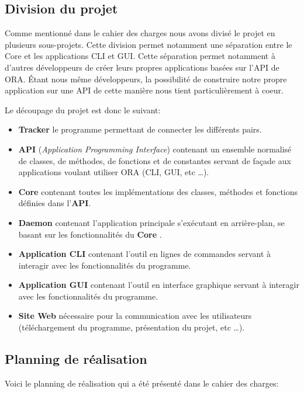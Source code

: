 \documentclass[11pt, a4paper]{report}
\begin{document}
    \clearpage
    \subsection{Division du projet}
Comme mentionné dans le cahier des charges nous avons divisé le projet en plusieurs sous-projets. Cette division permet notamment une séparation entre le Core et les applications CLI et GUI. Cette séparation permet notamment à d'autres développeurs de créer leurs propres applications basées sur l'API de ORA. Étant nous même développeurs, la possibilité de construire notre propre application sur une API de cette manière nous tient particulièrement à coeur.\newline

    Le découpage du projet est donc le suivant:
    \begin{itemize}
      \item \textbf{Tracker} le programme permettant de connecter les différents pairs.
      \item \textbf{API} (\textit{Application Programming Interface}) contenant un ensemble normalisé de classes, de méthodes, de fonctions et de constantes servant de façade aux applications voulant utiliser ORA (CLI, GUI, etc \ldots).
      \item \textbf{Core} contenant toutes les implémentations des classes, méthodes et fonctions définies dans l'\textbf{API}.
      \item \textbf{Daemon} contenant l'application principale s'exécutant en arrière-plan, se basant sur les fonctionnalités du \textbf{Core} .
      \item \textbf{Application CLI} contenant l'outil en lignes de commandes servant à interagir avec les fonctionnalités du programme.
      \item \textbf{Application GUI} contenant l'outil en interface graphique servant à interagir avec les fonctionnalités du programme.
      \item \textbf{Site Web} nécessaire pour la communication avec les utilisateurs (téléchargement du programme, présentation du projet, etc \ldots).
    \end{itemize}
    \bigbreak

    \subsection{Planning de réalisation}
Voici le planning de réalisation qui a été présenté dans le cahier des charges:
\end{document}
